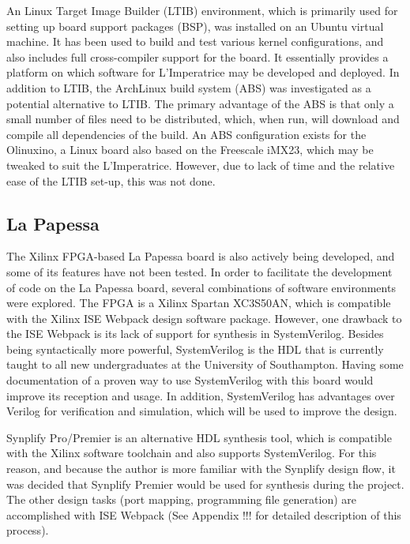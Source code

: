 		An Linux Target Image Builder (LTIB)  environment, which is primarily used for setting up board support packages (BSP), was installed on an Ubuntu virtual machine.  It has been used to build and test various kernel configurations, and also includes full cross-compiler support for the board.  It essentially provides a platform on which software for L'Imperatrice may be developed and deployed.
		In addition to LTIB, the ArchLinux build system (ABS) was investigated as a potential alternative to LTIB.  The primary advantage of the ABS is that only a small number of files need to be distributed, which, when run, will download and compile all dependencies of the build.  An ABS configuration exists for the Olinuxino, a Linux board also based on the Freescale iMX23, which may be tweaked to suit the L'Imperatrice.  However, due to lack of time and the relative ease of the LTIB set-up, this was not done.

	\subsection{La Papessa} %
	\label{sub:la_papessa_env}
		The Xilinx FPGA-based La Papessa board is also actively being developed, and some of its features have not been tested.  In order to facilitate the development of code on the La Papessa board, several combinations of software environments were explored.  The FPGA is a Xilinx Spartan XC3S50AN, which is compatible with the Xilinx ISE Webpack design software package.  However, one drawback to the ISE Webpack is its lack of support for synthesis in SystemVerilog. Besides being syntactically more powerful, SystemVerilog is the HDL that is currently taught to all new undergraduates at the University of Southampton. Having some documentation of a proven way to use SystemVerilog with this board would improve its reception and usage. In addition, SystemVerilog has advantages over Verilog for verification and simulation, which will be used to improve the design.

		Synplify Pro/Premier is an alternative HDL synthesis tool, which is compatible with the Xilinx software toolchain and also supports SystemVerilog. For this reason, and because the author is more familiar with the Synplify design flow, it was decided that Synplify Premier would be used for synthesis during the project.  The other design tasks (port mapping, programming file generation) are accomplished with ISE Webpack (See Appendix !!! for detailed description of this process).



